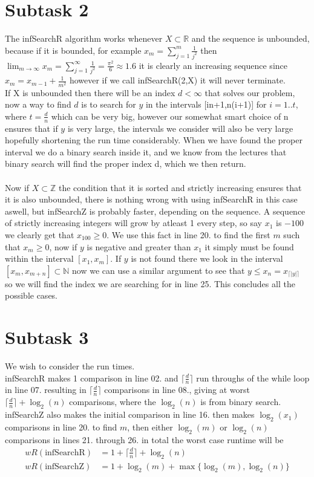 \documentclass{article}
\theoremstyle{remark}
\numberwithin{equation}{section}
\begin{document}
\section*{Subtask 2}
The infSearchR algorithm works whenever $X\subset\mathbb{R}$ and the sequence is unbounded, because if it is bounded, for example $x_m = \sum_{j=1}^{m} \frac{1}{j^2}$ then $\lim_{m\rightarrow\infty} x_m = \sum_{j=1}^{\infty} \frac{1}{j^2} = \frac{\pi^2}{6}\approx 1.6$ it is clearly an increasing sequence since $x_m = x_{m-1}+\frac{1}{m^2}$ however if we call infSearchR(2,X) it will never terminate.
\\If X is unbounded then there will be an index $d<\infty$ that solves our problem, now a way to find $d$ is to search for $y$ in the intervals [in+1,n(i+1)] for $i=1..t$, where $t = \frac{d}{n}$ which can be very big, however our somewhat smart choice of n ensures that if $y$ is very large, the intervals we consider will also be very large hopefully shortening the run time considerably. When we have found the proper interval we do a binary search inside it, and we know from the lectures that binary search will find the proper index d, which we then return.
\\\\Now if $X\subset\mathbb{Z}$ the condition that it is sorted and strictly increasing ensures that it is also unbounded, there is nothing wrong with using infSearchR in this case aswell, but infSearchZ is probably faster, depending on the sequence. A sequence of strictly increasing integers will grow by atleast 1 every step, so say $x_1$ is $-100$ we clearly get that $x_{100} \geq 0$. We use this fact in line 20. to find the first $m$ such that $x_m \geq 0$, now if $y$ is negative and greater than $x_1$ it simply must be found within the interval $[x_1,x_m]$. If $y$ is not found there we look in the interval $[x_m,x_{m+n}]\subset\mathbb{N}$ now we can use a similar argument to see that $y\leq x_n = x_{\lceil|y|\rceil}$ so we will find the index we are searching for in line 25. This concludes all the possible cases.
\section*{Subtask 3}
We wish to consider the run times.
\\infSearchR makes 1 comparison in line 02. and $\lceil\frac{d}{n}\rceil$ run throughs of the while loop in line 07. resulting in $\lceil\frac{d}{n}\rceil$ comparisons in line 08., giving at worst $\lceil\frac{d}{n}\rceil + \log_2(n)$ comparisons, where the $\log_2(n)$ is from binary search.
\\infSearchZ also makes the initial comparison in line 16. then makes $\log_2(x_1)$ comparisons in line 20. to find $m$, then either $\log_2(m)$ or $\log_2(n)$ comparisons in lines 21. through 26. in total the worst case runtime will be
\begin{align}
	wR(\text{infSearchR}) &= 1+\bigg\lceil\frac{d}{n}\bigg\rceil + \log_2(n)\\
	wR(\text{infSearchZ}) &= 1+\log_2(m)+\max\{\log_2(m),\log_2(n)\}
\end{align}
\end{document}
